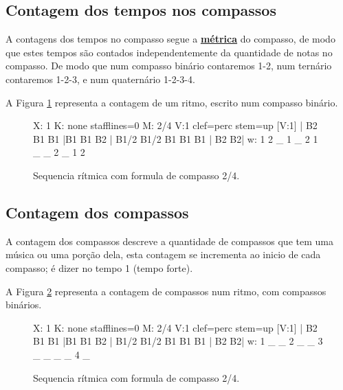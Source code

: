 \subsection{Contagem dos tempos nos compassos}
A contagens dos tempos no compasso segue a \hyperref[def:Metrica]{\textbf{métrica}}
do compasso, de modo que estes tempos são contados independentemente da quantidade de notas no compasso.
De modo que num compasso binário contaremos 1-2, num ternário contaremos 1-2-3, e
num quaternário 1-2-3-4.
\begin{example}
A Figura \ref{fig:contartempocomp1} representa a contagem de um ritmo,
escrito num compasso binário.
\end{example}
\begin{figure}[h]
    \centering
 \begin{abc}[name=abc-contartempocomp1,width=\linewidth]
%
X: 1 %
K: none stafflines=0 %
M:  2/4
V:1 clef=perc stem=up %
%
[V:1] | B2 B1 B1  |B1 B1 B2  | B1/2 B1/2 B1 B1 B1 | B2 B2|
w:      1  2  _    1  _  2     1  _ _    2  _       1  2
%       
\end{abc}
    \caption{Sequencia rítmica com formula de compasso 2/4.}\label{fig:contartempocomp1}
\end{figure}


\subsection{Contagem dos compassos}
A contagem dos compassos descreve a quantidade de compassos que tem uma música ou uma porção dela,
esta contagem se incrementa ao inicio de cada compasso; é dizer no tempo 1 (tempo forte).
\begin{example}
A Figura \ref{fig:contarcompassos2} representa a contagem de compassos num ritmo,
com compassos binários. 
\end{example}
\begin{figure}[h]
    \centering
 \begin{abc}[name=abc-contarcompassos2,width=\linewidth]
%
X: 1 %
K: none stafflines=0 %
M:  2/4
V:1 clef=perc stem=up %
%
[V:1] | B2 B1 B1  |B1 B1 B2  | B1/2 B1/2 B1 B1 B1 | B2 B2|
w:      1  _  _    2  _  _     3  _ _    _  _       4  _
%       
\end{abc}
    \caption{Sequencia rítmica com formula de compasso 2/4.}\label{fig:contarcompassos2}
\end{figure}

